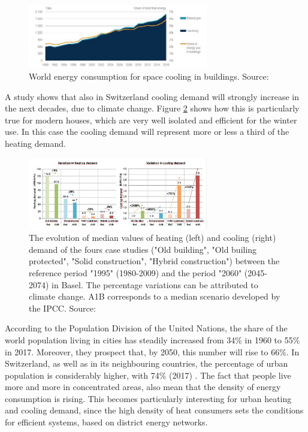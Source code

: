 \documentclass{article}
\begin{document}
\begin{figure}[h!]
	\centering
	\includegraphics[width=0.7\textwidth]{cooling_energy.JPG}
	\caption{World energy consumption for space cooling in buildings. Source:\cite{birolFutureCooling2018}}
	\label{fig:cooling_energy}
\end{figure}

A study shows that also in Switzerland cooling demand will strongly increase in the next decades, due to climate change. Figure \ref{fig:climat_CH} shows how this is particularly true for modern houses, which are very well isolated and efficient for the winter use. In this case the cooling demand will represent more or less a third of the heating demand\cite{hsluClimaBauPlanenAngesichts2017}.\\

\begin{figure}[h!]
	\centering
	\includegraphics[width=0.7\textwidth]{clima_CH.png}
	\caption{The evolution of median values of heating (left) and cooling (right) demand of the fours case studies ("Old building", "Old builing protected", "Solid construction", "Hybrid construction") between the reference period "1995" (1980-2009) and the period "2060" (2045-2074) in Basel. The percentage variations can be attributed to climate change. A1B corresponds to a median scenario developed by the IPCC. Source: \cite{hsluClimaBauPlanenAngesichts2017}}
	\label{fig:climat_CH}
\end{figure}

According to the Population Division of the United Nations, the share of the world population living in cities has steadily increased from 34\% in 1960 to 55\% in 2017. Moreover, they prospect that, by 2050, this number will rise to 66\%. In Switzerland, as well as in its neighbouring countries, the percentage of urban population is considerably higher, with 74\% (2017) \cite{unitednationspopulationdivisionWorldUrbanizationProspects}.
The fact that people live more and more in concentrated areas, also mean that the density of energy consumption is rising. This becomes particularly interesting for urban heating and cooling demand, since the high density of heat consumers sets the conditions for efficient  systems, based on district energy networks. 
\end{document}

